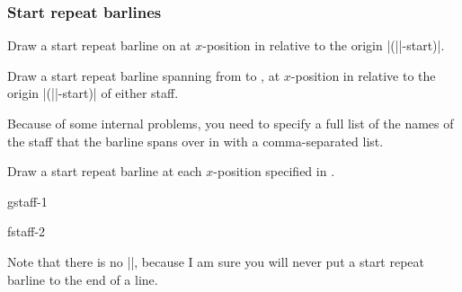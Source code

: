 \subsubsection{Start repeat barlines}\label{sec:multistaff:barlines:start}
\begin{command}{\tmstartrepeatbarline{}}
  Draw a start repeat barline on  at $x$-position  in 
  relative to the origin |(||-start)|.
\end{command}
\begin{command}{\tmstartrepeatbarline*{}}
  Draw a start repeat barline spanning from  to 
  , at $x$-position  in relative to 
  the origin |(||-start)| of either staff.

  Because of some internal problems, you need to specify a full list of the names 
  of the staff that the barline spans over in  with 
  a comma-separated list.
\end{command}
\begin{command}{\tmstartrepeatbarlineinline{}}
  Draw a start repeat barline at each $x$-position specified in .
\end{command}
\begin{codeexample}[]
\begin{tmline}%
\begin{tmstaff}{g}{staff-1}\end{tmstaff}%
\begin{tmstaff}{f}{staff-2}
\end{tmstaff}%
%
%
%
\end{tmline}
\end{codeexample}
Note that there is no |\tmstartrepeatbarlineendline|, because I am sure you 
will never put a start repeat barline to the end of a line.
